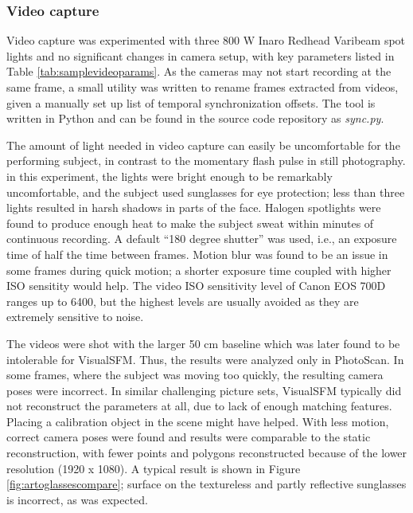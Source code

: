 \afterpage{\clearpage}
\subsubsection{Video capture}


Video capture was experimented with three 800 W Inaro Redhead Varibeam spot lights and no significant changes in camera setup, with key parameters listed in Table \ref{tab:samplevideoparams}.
As the cameras may not start recording at the same frame, a small utility was written to rename frames extracted from videos, given a manually set up list of temporal synchronization offsets.
The tool is written in Python and can be found in the source code repository as \emph{sync.py}.

The amount of light needed in video capture can easily be uncomfortable for the performing subject, in contrast to the momentary flash pulse in still photography.
in this experiment, the lights were bright enough to be remarkably uncomfortable, and the subject used sunglasses for eye protection; less than three lights resulted in harsh shadows in parts of the face.
Halogen spotlights were found to produce enough heat to make the subject sweat within minutes of continuous recording.
A default ``180 degree shutter'' was used, i.e., an exposure time of half the time between frames.
Motion blur was found to be an issue in some frames during quick motion; a shorter exposure time coupled with higher ISO sensitity would help.
The video ISO sensitivity level of Canon EOS 700D ranges up to 6400, but the highest levels are usually avoided as they are extremely sensitive to noise.

The videos were shot with the larger 50 cm baseline which was later found to be intolerable for VisualSFM.
Thus, the results were analyzed only in PhotoScan.
In some frames, where the subject was moving too quickly, the resulting camera poses were incorrect.
In similar challenging picture sets, VisualSFM typically did not reconstruct the parameters at all, due to lack of enough matching features.
Placing a calibration object in the scene might have helped.
With less motion, correct camera poses were found and results were comparable to the static reconstruction, with fewer points and polygons reconstructed because of the lower resolution (1920 x 1080).
A typical result is shown in Figure \ref{fig:artoglassescompare}; surface on the textureless and partly reflective sunglasses is incorrect, as was expected.

